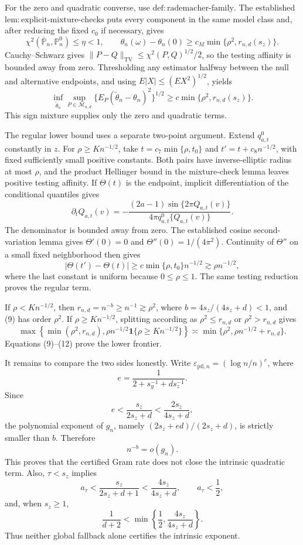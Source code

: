 For the zero and quadratic converse, use \(\mathrm{def{:}rademacher\text{-}family}\). The established \(\mathrm{lem{:}explicit\text{-}mixture\text{-}checks}\) puts every component in the same model class and, after reducing the fixed \(c_0\) if necessary, gives
\[
\chi^2(\overline{\mathbb P}_n,\mathbb P_n^0)\le\eta<1,
\qquad
\theta_n(\omega)-\theta_n(0)\ge c_M\min\{\rho^2,r_{n,d}(s_z)\}. \tag{8}
\]
Cauchy--Schwarz gives \(\|P-Q\|_{\mathrm{TV}}\le\chi^2(P,Q)^{1/2}/2\), so the testing affinity is bounded away from zero. Thresholding any estimator halfway between the null and alternative endpoints, and using \(E|X|\le(E X^2)^{1/2}\), yields
\[
\inf_{\widetilde\theta_n}\sup_{P\in\mathcal M_{n,d}}
\{E_P(\widetilde\theta_n-\theta_n)^2\}^{1/2}
\ge c\min\{\rho^2,r_{n,d}(s_z)\}.                               \tag{9}
\]
This sign mixture supplies only the zero and quadratic terms.

The regular lower bound uses a separate two-point argument. Extend \(q_{a,t}^{0}\) constantly in \(z\). For \(\rho\ge K n^{-1/2}\), take \(t=c_7\min\{\rho,t_0\}\) and \(t'=t+c_8n^{-1/2}\), with fixed sufficiently small positive constants. Both pairs have inverse-elliptic radius at most \(\rho\), and the product Hellinger bound in the mixture-check lemma leaves positive testing affinity. If \(\Theta(t)\) is the endpoint, implicit differentiation of the conditional quantiles gives
\[
\partial_tQ_{a,t}(v)
=-\frac{(2a-1)\sin\{2\pi Q_{a,t}(v)\}}
{4\pi q_{a,t}^{0}\{Q_{a,t}(v)\}}.                               \tag{10}
\]
The denominator is bounded away from zero. The established cosine second-variation lemma gives \(\Theta'(0)=0\) and \(\Theta''(0)=1/(4\pi^2)\). Continuity of \(\Theta''\) on a small fixed neighborhood then gives
\[
|\Theta(t')-\Theta(t)|\ge c\min\{\rho,t_0\}n^{-1/2}
\gtrsim\rho n^{-1/2},                                           \tag{11}
\]
where the last constant is uniform because \(0\le\rho\le1\). The same testing reduction proves the regular term.

If \(\rho<K n^{-1/2}\), then \(r_{n,d}=n^{-b}\ge n^{-1}\gtrsim\rho^2\), where \(b=4s_z/(4s_z+d)<1\), and (9) has order \(\rho^2\). If \(\rho\ge K n^{-1/2}\), splitting according as \(\rho^2\le r_{n,d}\) or \(\rho^2>r_{n,d}\) gives
\[
\max\!\left\{\min(\rho^2,r_{n,d}),
\rho n^{-1/2}\mathbf1\{\rho\ge Kn^{-1/2}\}\right\}
\asymp\min\{\rho^2,\rho n^{-1/2}+r_{n,d}\}.                   \tag{12}
\]
Equations (9)--(12) prove the lower frontier.

It remains to compare the two sides honestly. Write \(\varepsilon_{\mathrm{pil},n}=(\log n/n)^e\), where
\[
e=\frac1{2+s_y^{-1}+ds_z^{-1}}.
\]
Since
\[
e<\frac{s_z}{2s_z+d}<\frac{2s_z}{4s_z+d},                       \tag{13}
\]
the polynomial exponent of \(g_n\), namely \((2s_z+ed)/(2s_z+d)\), is strictly smaller than \(b\). Therefore
\[
n^{-b}=o(g_n).                                                    \tag{14}
\]
This proves that the certified Gram rate does not close the intrinsic quadratic term. Also, \(\tau<s_z\) implies
\[
a_\tau<\frac{s_z}{2s_z+d+1}<\frac{4s_z}{4s_z+d},
\qquad a_\tau<\frac12,                                          \tag{15}
\]
and, when \(s_z\ge1\),
\[
\frac1{d+2}<\min\!\left\{\frac12,\frac{4s_z}{4s_z+d}\right\}. \tag{16}
\]
Thus neither global fallback alone certifies the intrinsic exponent.

